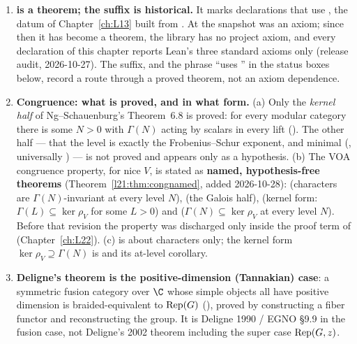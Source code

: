 \begin{enumerate}
\begin{itemize}
    ). No single declaration says `` is a modular tensor category''.
  \end{itemize}
\item \textbf{ is a theorem; the suffix  is historical.} It marks declarations that use
  , the datum  of Chapter~\ref{ch:L13} built from .
  At the snapshot  was an axiom; since then it has become a theorem, the library has no project
  axiom, and every declaration of this chapter reports Lean's three standard axioms only (release audit, 2026-10-27). The
  suffix, and the phrase ``uses '' in the status boxes below, record a route through a proved theorem, not
  an axiom dependence.
\item \textbf{Congruence: what is proved, and in what form.} (a) Only the \emph{kernel half} of Ng--Schauenburg's
  Theorem~6.8 is proved: for every modular category there is some $N>0$ with $\Gamma(N)$ acting by scalars in every lift
  (). The other half --- that the level is exactly the Frobenius--Schur exponent, and
  minimal (, universally ) --- is not proved and appears
  only as a hypothesis. (b) The VOA congruence property, for nice $V$, is stated as \textbf{named, hypothesis-free
  theorems} (Theorem~\ref{l21:thm:congnamed}, added 2026-10-28):  (characters are
  $\Gamma(N)$-invariant at every level $N$),  (the Galois half),
   (kernel form: $\Gamma(L)\subseteq\ker\rho_V$ for some $L>0$) and
   ($\Gamma(N)\subseteq\ker\rho_V$ at every level $N$). Before that revision the property
  was discharged only inside the proof term of  (Chapter~\ref{ch:L22}). (c)
   is about characters only; the kernel form $\ker\rho_V\supseteq\Gamma(N)$ is
   and its at-level corollary.
\item \textbf{Deligne's theorem is the positive-dimension (Tannakian) case}: a symmetric fusion category over $\C$
  whose simple objects all have positive dimension is braided-equivalent to $\operatorname{Rep}(G)$ (),
  proved by constructing a fiber functor and reconstructing the group. It is Deligne 1990 / EGNO §9.9 in the fusion case,
  not Deligne's 2002 theorem including the super case $\operatorname{Rep}(G,z)$.

\end{enumerate}
